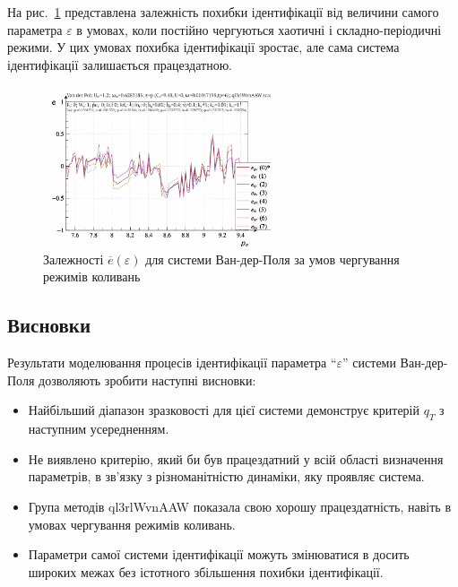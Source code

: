 На рис.~\ref{atu:f:vdp_e_varepsilon_2} представлена залежність похибки
ідентифікації від величини самого параметра
$\varepsilon$ в умовах, коли постійно чергуються хаотичні і
складно-періодичні режими. У цих умовах похибка ідентифікації
зростає, але сама система ідентифікації залишається
працездатною.


\begin{figure}[ht!]
\begin{center}
  \includegraphics[width=0.60\textwidth]{p/cha/vdp/vdp_id2-p_p_e_ql3rlWvnAAW_scan.png}
\end{center}
  \caption{Залежності $\overline{e}(\varepsilon)$ для системи Ван-дер-Поля за умов чергування режимів коливань}
\label{atu:f:vdp_e_varepsilon_2}
\end{figure}


\subsection{Висновки}%

Результати моделювання процесів ідентифікації параметра ``$\varepsilon$''
системи Ван-дер-Поля дозволяють зробити наступні
висновки:

\begin{itemize}

  \item
    Найбільший діапазон зразковості для цієї системи демонструє
    критерій $ q_T $ з наступним усередненням.

  \item
    Не виявлено критерію, який би був працездатний у всій області
    визначення параметрів, в зв'язку з різноманітністю динаміки,
    яку проявляє система.

  \item
    Група методів ql3rlWvnAAW показала свою хорошу працездатність,
    навіть в умовах чергування режимів коливань.

  \item
    Параметри самої системи ідентифікації можуть змінюватися
    в досить широких межах без істотного збільшення похибки
    ідентифікації.

\end{itemize}





